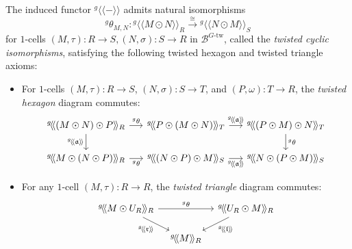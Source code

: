 \documentclass[11pt,oneside]{amsart}
\numberwithin{equation}{section}
\numberwithin{figure}{section}
\theoremstyle{plain}
\theoremstyle{definition}
\theoremstyle{remark}
\begin{document}
\begin{prop}\label{prop:g_twisted_axioms}
The induced functor ${}^g\!\langle\!\langle-\rangle\!\rangle$ admits natural isomorphisms
\[
{}^g\theta_{M,N}:
{}^g\!\langle\!\langle M\odot N\rangle\!\rangle_R
\xrightarrow{\cong}
{}^g\!\langle\!\langle N\odot M\rangle\!\rangle_S
\]
for \(1\)-cells
\(
(M,\tau):R\to S, (N,\sigma):S\to R
\)
in \(\mathcal B^{G\text{-tw}}\), called the \emph{twisted cyclic isomorphisms}, satisfying the following twisted hexagon and twisted triangle axioms:

\begin{itemize}
\item For \(1\)-cells \((M,\tau):R\to S\), \((N,\sigma):S\to T\), and \((P,\omega):T\to R\), the \emph{twisted hexagon} diagram commutes:
\[
\begin{tikzcd}[column sep=5mm, row sep=6mm]
{}^g\!\langle\!\langle (M \odot N)\odot P\rangle\!\rangle_R
  \arrow[r,"{}^g\theta"]
  \arrow[d,"{}^g\!\langle\!\langle\mathfrak a\rangle\!\rangle"']
&
{}^g\!\langle\!\langle P\odot (M\odot N)\rangle\!\rangle_T
  \arrow[r,"{}^g\!\langle\!\langle\mathfrak a\rangle\!\rangle"]
&
{}^g\!\langle\!\langle (P\odot M)\odot N\rangle\!\rangle_T
  \arrow[d,"{}^g\theta"]
\\
{}^g\!\langle\!\langle M\odot (N\odot P)\rangle\!\rangle_R
  \arrow[r,"{}^g\theta"']
&
{}^g\!\langle\!\langle (N\odot P)\odot M\rangle\!\rangle_S
  \arrow[r,"{}^g\!\langle\!\langle\mathfrak a\rangle\!\rangle"']
&
{}^g\!\langle\!\langle N\odot (P\odot M)\rangle\!\rangle_S
\end{tikzcd}
\]

\item For any \(1\)-cell \((M,\tau):R\to R\), the \emph{twisted triangle} diagram commutes:
\[
\begin{tikzcd}[column sep=3mm, row sep=5mm]
{}^g\!\langle\!\langle M\odot U_R\rangle\!\rangle_R
  \arrow[rr,"{}^g\theta"]
  \arrow[dr,"{}^g\!\langle\!\langle\mathfrak r\rangle\!\rangle"']
&&
{}^g\!\langle\!\langle U_R\odot M\rangle\!\rangle_R
  \arrow[dl,"{}^g\!\langle\!\langle\mathfrak l\rangle\!\rangle"]
\\
&
{}^g\!\langle\!\langle M\rangle\!\rangle_R
&
\end{tikzcd}
\]
\end{itemize}
\end{prop}

 
\end{document}
